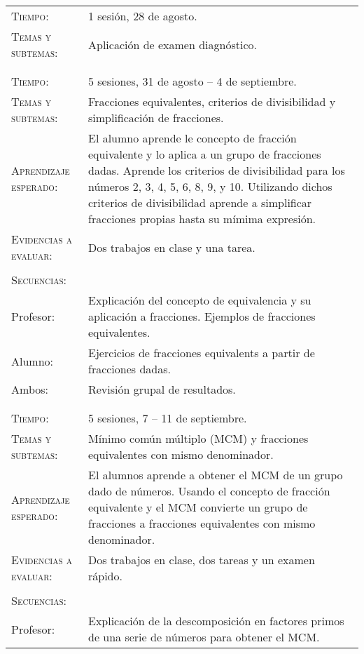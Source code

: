 \documentclass[letterpaper,10pt]{article}
\begin{document}
\begin{tabular}[t]{R{0.25\textwidth}p{0.71\textwidth}}
    \textsc{Tiempo:}                    & 1 sesi\'on, 28 de agosto. \\
    \textsc{Temas y subtemas:}          & Aplicaci\'on de examen diagn\'ostico. \\
    
\\ \hline \\
    
    \textsc{Tiempo:}                    & 5 sesiones, 31 de agosto -- 4 de septiembre. \\
    \textsc{Temas y subtemas:}          & Fracciones equivalentes, criterios de
    divisibilidad y simplificaci\'on de fracciones. \\
    \textsc{Aprendizaje esperado: }     & El alumno aprende le concepto de
    fracci\'on equivalente y lo aplica a un grupo de fracciones dadas. Aprende
    los criterios de divisibilidad para los n\'umeros 2, 3, 4, 5, 6, 8, 9, y 10.
    Utilizando dichos criterios de divisibilidad aprende a simplificar
    fracciones propias hasta su m\'imima expresi\'on. \\
    \textsc{Evidencias a evaluar:}      & Dos trabajos en clase y una tarea. \\\\
    \textsc{\large Secuencias:} \\
    Profesor:       & Explicaci\'on del concepto de equivalencia y su
    aplicaci\'on a fracciones. Ejemplos de fracciones equivalentes.\\ Alumno: &
    Ejercicios de fracciones equivalents a partir de fracciones dadas. \\ Ambos: 
    & Revisi\'on grupal de resultados. \\ 

\\ \hline \\

    \textsc{Tiempo:}                    & 5 sesiones, 7 -- 11 de septiembre. \\
    \textsc{Temas y subtemas:}          & M\'inimo com\'un m\'ultiplo (MCM) y
    fracciones equivalentes con mismo denominador. \\
    \textsc{Aprendizaje esperado: }     & El alumnos aprende a obtener el MCM de
    un grupo dado de n\'umeros. Usando el concepto de fracci\'on equivalente y
    el MCM convierte un grupo de fracciones a fracciones equivalentes con mismo
    denominador. \\
    \textsc{Evidencias a evaluar:}      & Dos trabajos en clase, dos tareas y un examen r\'apido. \\\\
    \textsc{\large Secuencias:} \\
    Profesor: & Explicaci\'on de la descomposici\'on en factores primos de una
    serie de n\'umeros para obtener el MCM.
\end{tabular}
\end{document}
